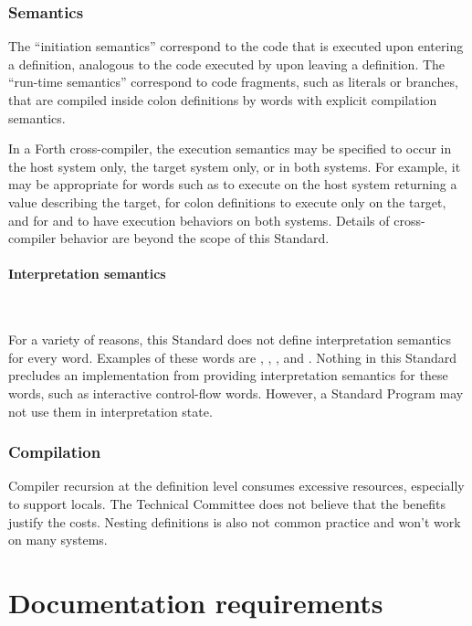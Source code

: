 \setcounter{subsubsection}{2}
\subsubsection{Semantics} %

The ``initiation semantics'' correspond to the code that is executed
upon entering a definition, analogous to the code executed by
 upon leaving a definition. The ``run-time semantics''
correspond to code fragments, such as literals or branches, that are
compiled inside colon definitions by words with explicit compilation
semantics.

In a Forth cross-compiler, the execution semantics may be specified
to occur in the host system only, the target system only, or in both
systems. For example, it may be appropriate for words such as
 to execute on the host system returning a value describing
the target, for colon definitions to execute only on the target, and
for  and  to have execution behaviors on
both systems. Details of cross-compiler behavior are beyond the scope
of this Standard.

\setcounter{paragraph}{1}
\paragraph{Interpretation semantics} ~ %
\label{rat:interpret}

For a variety of reasons, this Standard does not define interpretation
semantics for every word. Examples of these words are ,
, , and . Nothing in this Standard precludes
an implementation from providing interpretation semantics for these
words, such as interactive control-flow words. However, a Standard
Program may not use them in interpretation state.

\addtocounter{subsubsection}{1}
\subsubsection{Compilation} %

Compiler recursion at the definition level consumes excessive
resources, especially to support locals. The Technical Committee
does not believe that the benefits justify the costs. Nesting
definitions is also not common practice and won't work on many
systems.

\section{Documentation requirements} %

